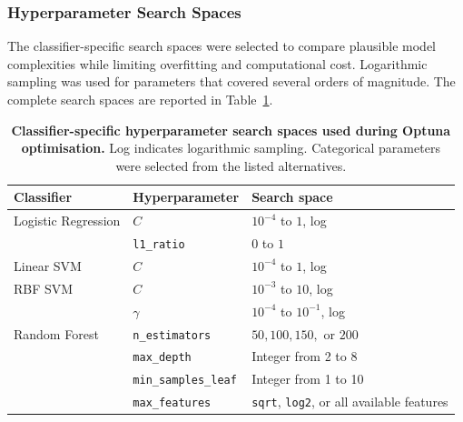 \documentclass[12pt,twocolumn]{article}
\begin{document}
\subsubsection{Hyperparameter Search Spaces}
\label{subsubsec:hyperparameter_search_spaces}

The classifier-specific search spaces were selected to compare
plausible model complexities while limiting overfitting and
computational cost. Logarithmic sampling was used for parameters that
covered several orders of magnitude. The complete search spaces are
reported in Table~\ref{tab:hyperparameter_search_spaces}.


\begin{table}[htbp]
\centering
\caption{\textbf{Classifier-specific hyperparameter search spaces used
during Optuna optimisation.} Log indicates logarithmic sampling.
Categorical parameters were selected from the listed alternatives.}
\label{tab:hyperparameter_search_spaces}
\scriptsize
\begin{tabularx}{\textwidth}{p{3.0cm} p{3.4cm} X}
\toprule
\textbf{Classifier} &
\textbf{Hyperparameter} &
\textbf{Search space} \\
\midrule

Logistic Regression
& \(C\)
& \(10^{-4}\) to \(1\), log \\

& \texttt{l1\_ratio}
& \(0\) to \(1\) \\

\midrule

Linear SVM
& \(C\)
& \(10^{-4}\) to \(1\), log \\

\midrule

RBF SVM
& \(C\)
& \(10^{-3}\) to \(10\), log \\

& \(\gamma\)
& \(10^{-4}\) to \(10^{-1}\), log \\

\midrule

Random Forest
& \texttt{n\_estimators}
& \(50, 100, 150,\) or \(200\) \\

& \texttt{max\_depth}
& Integer from 2 to 8 \\

& \texttt{min\_samples\_leaf}
& Integer from 1 to 10 \\

& \texttt{max\_features}
& \texttt{sqrt}, \texttt{log2}, or all available features \\


\end{tabularx}
\end{table}
\end{document}

